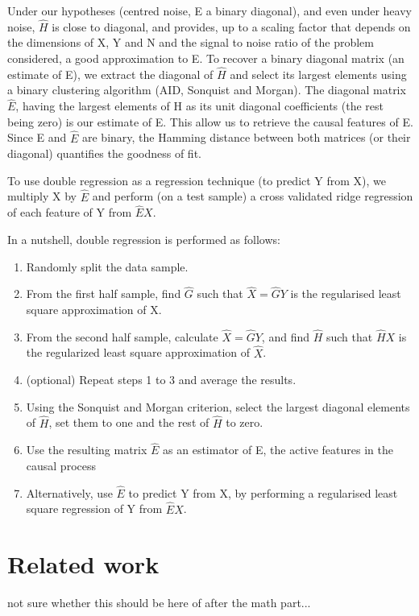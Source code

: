 \documentclass{article}
\begin{document}
Under our hypotheses (centred noise, E a binary diagonal), and even under heavy noise, $\hat H$ is close to diagonal, and provides, up to a scaling factor that depends on the dimensions of X, Y and N and the signal to noise ratio of the problem considered, a good approximation to E. To recover a binary diagonal matrix (an estimate of E), we extract the diagonal of $\hat H$ and select its largest elements using a binary clustering algorithm (AID, Sonquist and Morgan). The diagonal matrix $\hat E$, having the largest elements of H as its unit diagonal coefficients (the rest being zero) is our estimate of E. This allow us to retrieve the causal features of E. Since E and $\hat E$ are binary, the Hamming distance between both matrices (or their diagonal) quantifies the goodness of fit.

To use double regression as a regression technique (to predict Y from X), we multiply X by $\hat E$ and perform (on a test sample) a cross validated ridge regression of each feature of Y from $\hat E X$.

In a nutshell, double regression is performed as follows:
\begin{enumerate}
\item Randomly split the data sample.
\item From the first half sample, find $\hat G$ such that $\hat X = \hat G Y$ is the regularised least square approximation of X.
\item From the second half sample, calculate $\hat X = \hat G Y$, and find $\hat H$ such that $\hat H X$ is the regularized least square approximation of $\hat X$.
\item (optional) Repeat steps 1 to 3 and average the results.
\item Using the Sonquist and Morgan criterion, select the largest diagonal elements of $\hat H$, set them to one and the rest of $\hat  H$ to zero.
\item Use the resulting matrix $\hat E$ as an estimator of E, the active features in the causal process
\item Alternatively, use $\hat E$ to predict Y from X, by performing a regularised least square regression of Y from $\hat E X$. 
\end{enumerate}

\section{Related work}
not sure whether this should be here of after the math part... 
\end{document}

